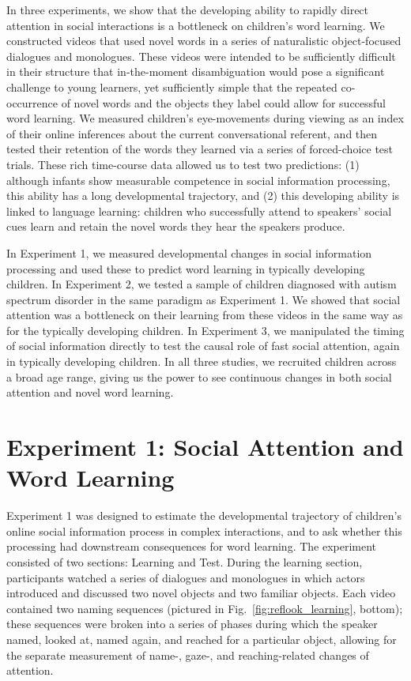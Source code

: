 \documentclass{pnastwo}
\begin{document}
\begin{article}
In three experiments, we show that the developing ability to rapidly direct attention in social interactions is a bottleneck on children's word learning. We constructed videos that used novel words in a series of naturalistic object-focused dialogues and monologues. These videos were intended to be sufficiently difficult in their structure that in-the-moment disambiguation would pose a significant challenge to young learners, yet sufficiently simple that the repeated co-occurrence of novel words and the objects they label could allow for successful word learning. We measured children's eye-movements during viewing as an index of their online inferences about the current conversational referent, and then tested their retention of the words they learned via a series of forced-choice test trials. These rich time-course data allowed us to test two predictions: (1) although infants show measurable competence in social information processing, this ability has a long developmental trajectory, and (2) this developing ability is linked to language learning: children who successfully attend to speakers' social cues learn and retain the novel words they hear the speakers produce.

In Experiment 1, we measured developmental changes in social information processing and used these to predict word learning in typically developing children. In Experiment 2, we tested a sample of children diagnosed with autism spectrum disorder in the same paradigm as Experiment 1. We showed that social attention was a bottleneck on their learning from these videos in the same way as for the typically developing children. In Experiment 3, we manipulated the timing of social information directly to test the causal role of fast social attention, again in typically developing children. In all three studies, we recruited children across a broad age range, giving us the power to see continuous changes in both social attention and novel word learning.

\section{Experiment 1: Social Attention and Word Learning}

Experiment 1 was designed to estimate the developmental trajectory of children's online social information process in complex interactions, and to ask whether this processing had downstream consequences for word learning. The experiment consisted of two sections: Learning and Test. During the learning section, participants watched a series of dialogues and monologues in which actors introduced and discussed two novel objects and two familiar objects. Each video contained two naming sequences (pictured in Fig.~\ref{fig:reflook_learning}, bottom); these sequences were broken into a series of phases during which the speaker named, looked at, named again, and reached for a particular object, allowing for the separate measurement of name-, gaze-, and reaching-related changes of attention.


\end{article}
\end{document}

